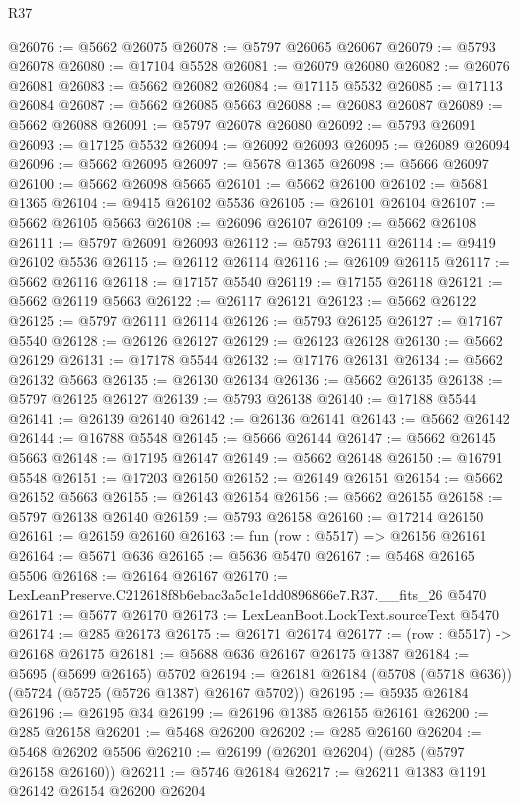 \begin{lexlean}{R37}
\begin{coremodule}
@26076 := @5662 @26075
@26078 := @5797 @26065 @26067
@26079 := @5793 @26078
@26080 := @17104 @5528
@26081 := @26079 @26080
@26082 := @26076 @26081
@26083 := @5662 @26082
@26084 := @17115 @5532
@26085 := @17113 @26084
@26087 := @5662 @26085 @5663
@26088 := @26083 @26087
@26089 := @5662 @26088
@26091 := @5797 @26078 @26080
@26092 := @5793 @26091
@26093 := @17125 @5532
@26094 := @26092 @26093
@26095 := @26089 @26094
@26096 := @5662 @26095
@26097 := @5678 @1365
@26098 := @5666 @26097
@26100 := @5662 @26098 @5665
@26101 := @5662 @26100
@26102 := @5681 @1365
@26104 := @9415 @26102 @5536
@26105 := @26101 @26104
@26107 := @5662 @26105 @5663
@26108 := @26096 @26107
@26109 := @5662 @26108
@26111 := @5797 @26091 @26093
@26112 := @5793 @26111
@26114 := @9419 @26102 @5536
@26115 := @26112 @26114
@26116 := @26109 @26115
@26117 := @5662 @26116
@26118 := @17157 @5540
@26119 := @17155 @26118
@26121 := @5662 @26119 @5663
@26122 := @26117 @26121
@26123 := @5662 @26122
@26125 := @5797 @26111 @26114
@26126 := @5793 @26125
@26127 := @17167 @5540
@26128 := @26126 @26127
@26129 := @26123 @26128
@26130 := @5662 @26129
@26131 := @17178 @5544
@26132 := @17176 @26131
@26134 := @5662 @26132 @5663
@26135 := @26130 @26134
@26136 := @5662 @26135
@26138 := @5797 @26125 @26127
@26139 := @5793 @26138
@26140 := @17188 @5544
@26141 := @26139 @26140
@26142 := @26136 @26141
@26143 := @5662 @26142
@26144 := @16788 @5548
@26145 := @5666 @26144
@26147 := @5662 @26145 @5663
@26148 := @17195 @26147
@26149 := @5662 @26148
@26150 := @16791 @5548
@26151 := @17203 @26150
@26152 := @26149 @26151
@26154 := @5662 @26152 @5663
@26155 := @26143 @26154
@26156 := @5662 @26155
@26158 := @5797 @26138 @26140
@26159 := @5793 @26158
@26160 := @17214 @26150
@26161 := @26159 @26160
@26163 := fun (row : @5517) => @26156 @26161
@26164 := @5671 @636
@26165 := @5636 @5470
@26167 := @5468 @26165 @5506
@26168 := @26164 @26167
@26170 := LexLeanPreserve.C212618f8b6ebac3a5c1e1dd0896866e7.R37.__fits_26 @5470
@26171 := @5677 @26170
@26173 := LexLeanBoot.LockText.sourceText @5470
@26174 := @285 @26173
@26175 := @26171 @26174
@26177 := (row : @5517) -> @26168 @26175
@26181 := @5688 @636 @26167 @26175 @1387
@26184 := @5695 (@5699 @26165) @5702
@26194 := @26181 @26184 (@5708 (@5718 @636)) (@5724 (@5725 (@5726 @1387) @26167 @5702))
@26195 := @5935 @26184
@26196 := @26195 @34
@26199 := @26196 @1385 @26155 @26161
@26200 := @285 @26158
@26201 := @5468 @26200
@26202 := @285 @26160
@26204 := @5468 @26202 @5506
@26210 := @26199 (@26201 @26204) (@285 (@5797 @26158 @26160))
@26211 := @5746 @26184
@26217 := @26211 @1383 @1191 @26142 @26154 @26200 @26204

\end{coremodule}
\end{lexlean}
